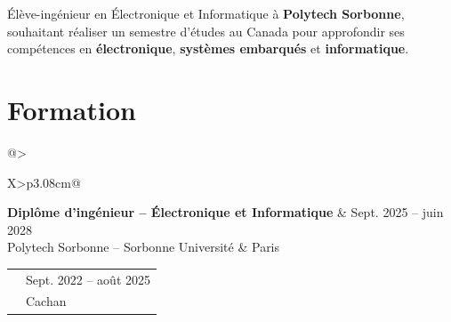 \documentclass[9pt,a4paper]{extarticle}
\makeatletter
\newcommand{\entry}[4]{%
\begin{tabularx}{\linewidth}{@{}>{\raggedright\arraybackslash}X>{\raggedleft\arraybackslash}p{3.08cm}@{}}
 {\bfseries\color{bleu}#1} & {\fontsize{8.5}{9.3}\selectfont\color{secondaire}#2} \\[-2pt]
 {\fontsize{8.5}{9.6}\selectfont\color{secondaire}#3} & {\fontsize{8.5}{9.3}\selectfont\color{secondaire}#4}
\end{tabularx}\vspace{-3.4pt}\par}
\makeatother
\begin{document}
{\fontsize{9.0}{10.7}\selectfont
Élève-ingénieur en Électronique et Informatique à \textbf{Polytech Sorbonne}, souhaitant réaliser un semestre d'études au Canada pour approfondir ses compétences en \textbf{électronique}, \textbf{systèmes embarqués} et \textbf{informatique}.\par
\section{Formation}
\entry{Diplôme d'ingénieur -- Électronique et Informatique}{Sept. 2025 -- juin 2028}{Polytech Sorbonne -- Sorbonne Université}{Paris}
\vspace{1.1pt}
\entry{BUT Génie électrique et informatique industrielle Option Electricité et Maîtrise de l'Energie}{Sept. 2022 -- août 2025}{IUT de Cachan -- Université Paris-Saclay}{Cachan}

}
\end{document}
